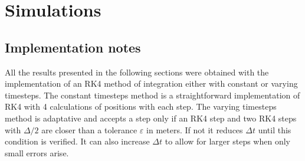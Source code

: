 \section{Simulations}

\subsection{Implementation notes}
All the results presented in the following sections were obtained with the implementation of an RK4 method of integration either with constant or varying timesteps. The constant timesteps method is a straightforward implementation of RK4 with 4 calculations of positions with each step. The varying timesteps method is adaptative and accepts a step only if an RK4 step and two RK4 steps with $\Delta / 2$ are closer than a tolerance $\varepsilon$ in meters. If not it reduces $\Delta t$ until this condition is verified. It can also increase $\Delta t$ to allow for larger steps when only small errors arise.


